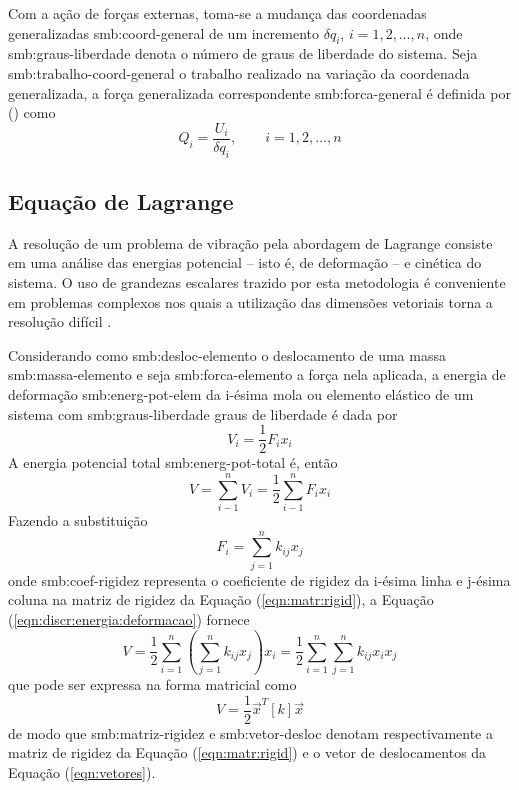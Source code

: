 \documentclass[12pt,openright,oneside,a4paper,
	chapter=TITLE,section=TITLE,
	english,brazil]{abntex2}
\begin{document}
	Com a ação de forças externas, toma-se a mudança das coordenadas generalizadas \gls{smb:coord-general} de um incremento $\delta q_i $, $ i = 1, 2, \dots, n $, onde \gls{smb:graus-liberdade} denota o número de graus de liberdade do sistema. Seja \gls{smb:trabalho-coord-general} o trabalho realizado na variação da coordenada generalizada, a força generalizada correspondente \gls{smb:forca-general} é definida por  (\citeyear{rao:2008}) como
	\begin{equation}
		Q_i = \frac{U_i}{\delta q_i},\qquad i = 1, 2, \dots, n
	\end{equation}
	
	\subsection{Equação de Lagrange}
	A resolução de um problema de vibração pela abordagem de Lagrange consiste em uma análise das energias potencial -- isto é, de deformação -- e cinética do sistema. O uso de grandezas escalares trazido por esta metodologia é conveniente em problemas complexos nos quais a utilização das dimensões vetoriais torna a resolução difícil \cite{savi:2017}.
	
	Considerando como \gls{smb:desloc-elemento} o deslocamento de uma massa \gls{smb:massa-elemento} e seja \gls{smb:forca-elemento} a força nela aplicada, a energia de deformação \gls{smb:energ-pot-elem} da i-ésima mola ou elemento elástico de um sistema com \gls{smb:graus-liberdade} graus de liberdade é dada por \cite{rao:2008}
	\begin{equation}
		V_i = \frac{1}{2}F_i x_i
	\end{equation}
	A energia potencial total \gls{smb:energ-pot-total} é, então
	\begin{equation} \label{eqn:discr:energia:deformacao}
		V = \sum_{i-1}^{n}V_i = \frac{1}{2}\sum_{i-1}^{n}F_i x_i
	\end{equation}
	Fazendo a substituição
	\begin{equation}
		F_i = \sum_{j=1}^{n}k_{ij} x_j
	\end{equation}
	onde \gls{smb:coef-rigidez} representa o coeficiente de rigidez da i-ésima linha e j-ésima coluna na matriz de rigidez da Equação (\ref{eqn:matr:rigid}), a Equação (\ref{eqn:discr:energia:deformacao}) fornece
	\begin{equation}
		V = \frac{1}{2}\sum_{i=1}^{n}\left(\sum_{j=1}^{n}k_{ij} x_j\right)x_i = \frac{1}{2}\sum_{i=1}^{n}\sum_{j=1}^{n}k_{ij} x_i x_j
	\end{equation}
	que pode ser expressa na forma matricial como
	\begin{equation}
		V = \frac{1}{2}\vec{x}^T [k] \vec{x}
	\end{equation}
	de modo que \gls{smb:matriz-rigidez} e \gls{smb:vetor-desloc} denotam respectivamente a matriz de rigidez da Equação (\ref{eqn:matr:rigid}) e o vetor de deslocamentos da Equação (\ref{eqn:vetores}).
	
\end{document}
